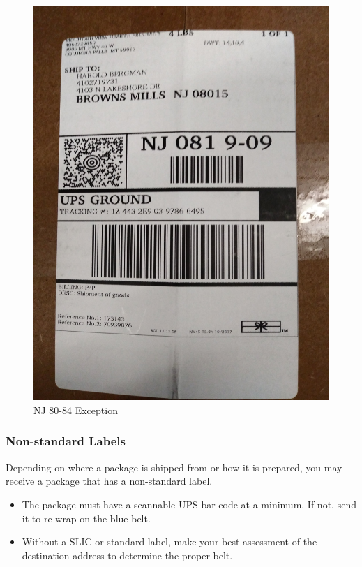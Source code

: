 \documentclass[12pt]{article}
\begin{document}
\begin{figure}[H]
    \centering
    \includegraphics[width=0.4\linewidth]{20171221_161034}
    \caption{NJ 80-84 Exception}
\end{figure}

\subsubsection{Non-standard Labels}
Depending on where a package is shipped from or how it is prepared, you may receive a package that has a non-standard label.

\begin{itemize}
    \item The package must have a scannable UPS bar code at a minimum. If not, send it to re-wrap on the blue belt.
    \item Without a SLIC or standard label, make your best assessment of the destination address to determine the proper belt.
\end{itemize}
\end{document}
